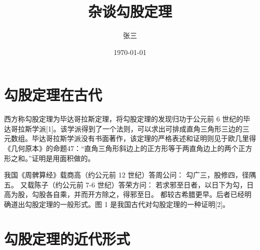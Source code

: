 \documentclass[UTF8]{ctexart}
\title{杂谈勾股定理}
\author{张三}
\date{\today}
\begin{document}
\maketitle
\tableofcontents
\section{勾股定理在古代}
西方称勾股定理为毕达哥拉斯定理，将勾股定理的发现归功于公元前 6 世纪的毕达哥拉斯学派[1]。该学派得到了一个法则，可以求出可排成直角三角形三边的三元数组。毕达哥拉斯学派没有书面著作，该定理的严格表述和证明则见于欧几里得《几何原本》的命题47：“直角三角形斜边上的正方形等于两直角边上的两个正方形之和。”证明是用面积做的。

我国《周髀算经》载商高（约公元前 12 世纪）答周公问：
勾广三，股修四，径隅五。
又载陈子（约公元前 7-6 世纪）答荣方问：
若求邪至日者，以日下为勾，日高为股，勾股各自乘，并而开方除之，得邪至日。
都较古希腊更早。后者已经明确道出勾股定理的一般形式。图 1 是我国古代对勾股定理的一种证明[2]。

\section{勾股定理的近代形式}

\end{document}
